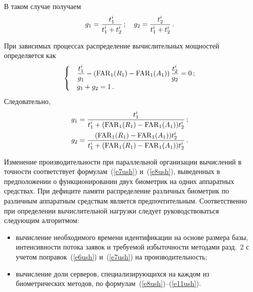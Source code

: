 \begin{multicols}{2}
     \begin{figure*} %
     \vspace*{1pt}
\begin{center}
\mbox{%
\epsfxsize=134.676mm
}
\end{center}
\vspace*{-9pt}
\end{figure*}
    
\noindent
В таком случае получаем
     \begin{equation}
     g_1  = \displaystyle\frac{\displaystyle t_1^i\mathstrut}{\displaystyle t_1^i+t_2^i\mathstrut}\,;\quad 
     g_2  = \displaystyle\frac{\displaystyle t_2^i\mathstrut}{\displaystyle t_1^i+t_2^i\mathstrut}\,.
          \label{e10ush}
     \end{equation}
     
     При зависимых процессах распределение вы\-чис\-лительных мощностей 
определяется как
     \begin{equation}
     \begin{cases}
     &\displaystyle\frac{\displaystyle t_1^i\mathstrut}{\displaystyle g_1\mathstrut} -\left (\mathrm{FAR}_1(R_1)-\mathrm{FAR}_1(A_1)\right 
)\displaystyle\frac{\displaystyle t_2^i\mathstrut}{\displaystyle g_2\mathstrut} =0\,;\\
     &g_1+g_2=1\,.
     \end{cases}
     \label{e11ush}
     \end{equation}
Следовательно,
     \begin{align*}
     g_1 & = \displaystyle\frac{\displaystyle t_1^i\mathstrut}{\displaystyle t_1^i+(\mathrm{FAR}_1(R_1)-
\mathrm{FAR}_1(A_1))t_2^i\mathstrut}\,;\\
     g_2 & = \displaystyle\frac{\displaystyle (\mathrm{FAR}_1(R_1)-
\mathrm{FAR}_1(A_1))t_2^i\mathstrut}{\displaystyle t_1^i+(\mathrm{FAR}_1(R_1)-
\mathrm{FAR}_1(A_1))t_2^i\mathstrut}\,.
     \end{align*}
     
     Изменение производительности при параллельной организации вычислений в 
точности соответствует формулам~(\ref{e7ush}) и~(\ref{e8ush}), выведенных в 
предположении о функционировании двух биометрик на одних аппаратных средствах. 
При дефиците памяти распределение различных био\-мет\-рик по различным 
аппаратным средствам является пред\-почтительным. Соответственно при определении 
вычислительной нагрузки следует руководствоваться следующим алгоритмом:
     \begin{itemize}
\item вычисление необходимого времени идентификации на основе размера 
базы, интенсивности потока заявок и требуемой избыточности методами 
разд.~2 с учетом поправок~(\ref{e6ush}) и~(\ref{e7ush}) на 
производительность;
\item вычисление доли серверов, специализиру\-ющих\-ся на каждом из 
биометрических методов, по формулам~(\ref{e8ush})--(\ref{e11ush}).
     \end{itemize}
     

\end{multicols}
